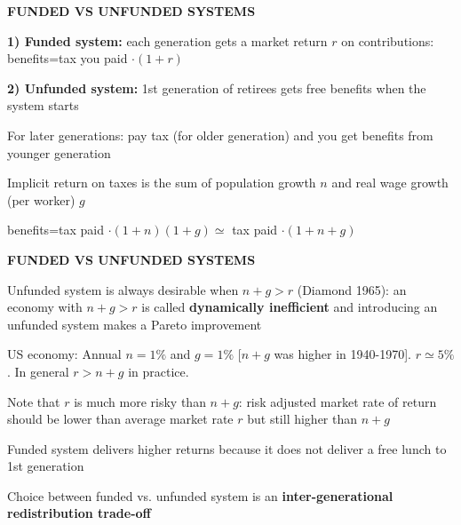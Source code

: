 \documentclass[landscape]{slides}
\begin{document}
\begin{slide}
\begin{center}
{\bf FUNDED VS UNFUNDED SYSTEMS}
\end{center}

{\bf 1) Funded system:} each generation gets a market return $r$ on
contributions: benefits=tax you paid $\cdot (1+r)$

{\bf 2) Unfunded system:} 1st generation of retirees gets free benefits when the
system starts

For later generations: pay tax (for older generation) and you get benefits from younger
generation


Implicit return on taxes is the sum of population growth $n$ and real wage growth (per worker) $g$

benefits=tax paid $\cdot (1+n)(1+g) \simeq$ tax paid $\cdot (1 + n + g)$

\end{slide}

%





\begin{slide}
\begin{center}
{\bf FUNDED VS UNFUNDED SYSTEMS}
\end{center}

Unfunded system is always desirable when $n+g>r$ (Diamond 1965): an economy
with $n+g>r$ is called \textbf{dynamically inefficient} and introducing an unfunded system
makes a Pareto improvement

US economy: Annual $n=1\%$ and $g=1\%$ [$n+g$ was higher in
1940-1970]. $r \simeq 5\%$. In general $r>n+g$ in practice.

Note that $r$ is much more risky than $n+g$: risk adjusted market
rate of return should be lower than average market rate $r$ but still higher than $n+g$

Funded system delivers higher returns because it does not deliver
a free lunch to 1st generation

Choice between funded vs. unfunded system is an \textbf{inter-generational redistribution trade-off}


\end{slide}
\end{document}
